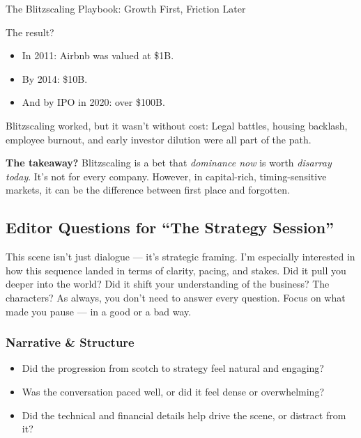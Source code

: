 \begin{HistoricalSidebar}{The Blitzscaling Playbook: Growth First, Friction Later}
  \medskip
  
  The result?

  \medskip
  
  \begin{itemize}
    \item In 2011: Airbnb was valued at \$1B.
    \item By 2014: \$10B.
    \item And by IPO in 2020: over \$100B.
  \end{itemize}
  
  \medskip
  
  Blitzscaling worked, but it wasn't without cost:  
  Legal battles, housing backlash, employee burnout, and early investor dilution were all part of the path.
  
  \medskip
  
  \textbf{The takeaway?}  
  Blitzscaling is a bet that \textit{dominance now} is worth \textit{disarray today}.  
  It’s not for every company. However, in capital-rich, timing-sensitive markets, it can be the difference between first place 
  and forgotten.
  
\end{HistoricalSidebar}


\subsection{Editor Questions for ``The Strategy Session''}

This scene isn’t just dialogue — it’s strategic framing. I’m especially interested in how this sequence landed in terms of clarity, pacing, and stakes. Did it pull you deeper into the world? Did it shift your understanding of the business? The characters? As always, you don’t need to answer every question. Focus on what made you pause — in a good or a bad way.

\subsubsection{Narrative \& Structure}

\begin{itemize}
  \item Did the progression from scotch to strategy feel natural and engaging?
  \item Was the conversation paced well, or did it feel dense or overwhelming?
  \item Did the technical and financial details help drive the scene, or distract from it?
\end{itemize}

